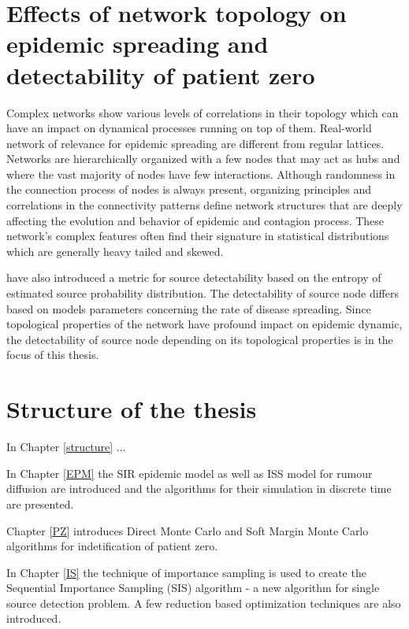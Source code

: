 \documentclass[times, utf8, diplomski]{fer}
\begin{document}
\section{Effects of network topology on epidemic spreading and detectability of patient zero}
Complex networks show various levels of correlations in their topology which can have an impact on dynamical processes running on top of them. 
Real-world network of relevance for epidemic spreading are different from regular lattices. Networks are hierarchically organized with a few nodes that may act as hubs and where the vast majority of nodes have few interactions. Although randomness in the connection process of nodes is always present, organizing principles and correlations in the connectivity patterns define network structures that are deeply affecting the evolution and behavior of epidemic and contagion process. These network's complex features often find their signature in statistical distributions which are generally heavy tailed and skewed. 

\citet{Nino} have also introduced a metric for source detectability based on the entropy of estimated source probability distribution. The detectability of source node differs based on models parameters concerning the rate of disease spreading. Since topological properties of the network  have profound impact on epidemic dynamic, the detectability of source node depending on its topological properties is in the focus of this thesis.

\section{Structure of the thesis}
In Chapter \ref{structure} ... 

In Chapter \ref{EPM} the SIR epidemic model as well as ISS model for rumour diffusion are introduced and the algorithms for their simulation in discrete time are presented. 

Chapter \ref{PZ} introduces Direct Monte Carlo and Soft Margin Monte Carlo algorithms \cite{Nino} for indetification of patient zero. 

In Chapter \ref{IS} the technique of importance sampling is  used to create the Sequential Importance Sampling (SIS) algorithm - a new algorithm for single source detection problem. A few reduction based optimization techniques are also introduced. 
\end{document}
